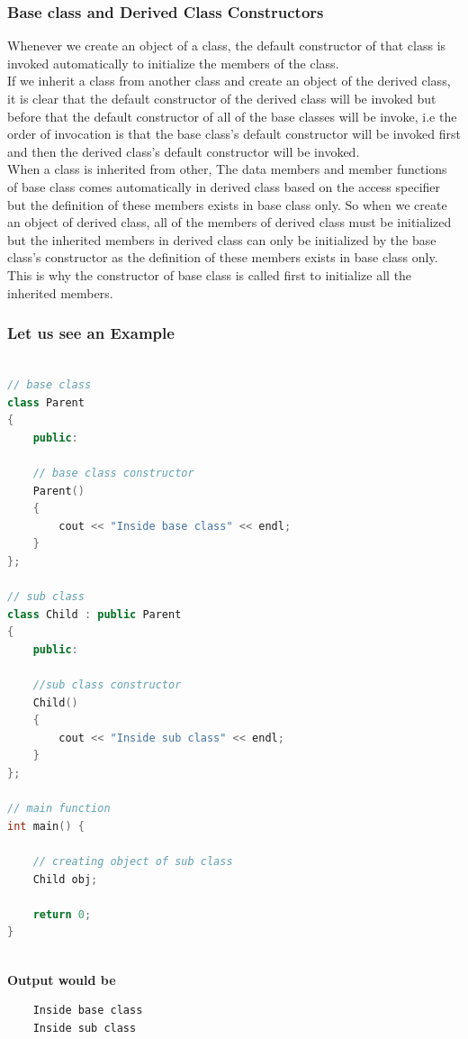 \documentclass[11pt]{article}
\begin{document}
\subsubsection{Base class and Derived Class Constructors}
Whenever we create an object of a class, the default constructor of that class is invoked automatically to initialize the members of the class. \\

If we inherit a class from another class and create an object of the derived class, it is clear that the default constructor of the derived class will be invoked but before that the default constructor of all of the base classes will be invoke, i.e the order of invocation is that the base class's default constructor will be invoked first and then the derived class's default constructor will be invoked.\\

When a class is inherited from other, The data members and member functions of base class comes automatically in derived class based on the access specifier but the definition of these members exists in base class only. So when we create an object of derived class, all of the members of derived class must be initialized but the inherited members in derived class can only be initialized by the base class's constructor as the definition of these members exists in base class only. \\

This is why the constructor of base class is called first to initialize all the inherited members.

\subsubsection*{Let us see an Example}

\begin{lstlisting}[language = C++]
 
// base class
class Parent
{
    public:
     
    // base class constructor
    Parent()
    {
        cout << "Inside base class" << endl;
    }
};
 
// sub class
class Child : public Parent
{
    public:
     
    //sub class constructor
    Child()
    {
        cout << "Inside sub class" << endl;
    }
};
 
// main function
int main() {
      
    // creating object of sub class
    Child obj;

    return 0;
}
	
\end{lstlisting}
\textbf{Output would be}
\begin{verbatim}
	Inside base class
	Inside sub class
\end{verbatim}
\end{document}
